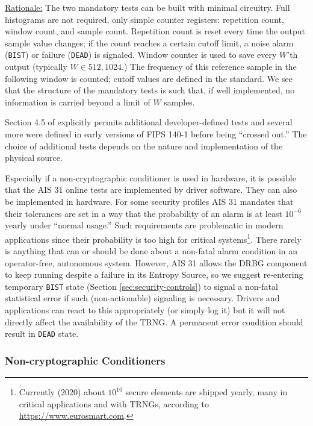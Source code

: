     \underline{Rationale:}
    The two mandatory tests can be built with minimal circuitry.
    Full histograms are not required, only simple counter registers:
    repetition count, window count, and sample count.
    Repetition count is reset every time the output sample value
    changes; if the count reaches a certain cutoff limit, a noise alarm
    (\verb|BIST|) or failure (\verb|DEAD|) is signaled. Window counter is
    used to save every $W$'th output (typically $W \in { 512, 1024 }$.)
    The frequency of this reference sample in the following window is
    counted; cutoff values are defined in the standard. We see that the
    structure of the mandatory tests is such that, if well implemented,
    no information is carried beyond a limit of $W$ samples.

    Section 4.5 of \cite{TuBaKe+18} explicitly permits additional
    developer-defined tests and several more were defined in early
    versions of FIPS 140-1 before being ``crossed out.'' The choice
    of additional tests depends on the nature and implementation of the
    physical source.

    Especially if a non-cryptographic conditioner is used in hardware,
    it is possible that the AIS 31 \cite{KiSc11} online tests are
    implemented by driver software. They can also be implemented in hardware.
    For some security profiles AIS 31 mandates that their tolerances are
    set in a way that the probability of an alarm is at least $10^{-6}$
    yearly under ``normal usage.'' Such requirements are problematic
    in modern applications since their probability is too high for
    critical systems\footnote{Currently (2020) about $10^{10}$ secure
    elements are shipped yearly, many in critical applications and with
    TRNGs, according to \url{https://www.eurosmart.com}.}.
    There rarely is anything that can or should be done about a non-fatal
    alarm condition in an operator-free, autonomous system. However,
    AIS 31 allows the DRBG component to keep running despite a failure in
    its Entropy Source, so we suggest re-entering temporary \verb|BIST|
    state (Section \ref{sec:security-controls}) to signal a non-fatal
    statistical error if such (non-actionable) signaling is necessary.
    Drivers and applications can react to this appropriately (or simply
    log it) but it will not directly affect the availability of the TRNG.
    A permanent error condition should result in \verb|DEAD| state.

\subsubsection{Non-cryptographic Conditioners}
\label{sec:noncrypto}

